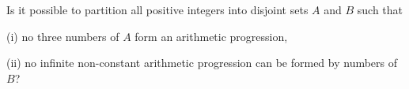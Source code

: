 Is it possible to partition all positive integers into disjoint sets $A$ and $B$ such that

(i) no three numbers of $A$ form an arithmetic progression,

(ii) no infinite non-constant arithmetic progression can be formed by numbers of $B$?